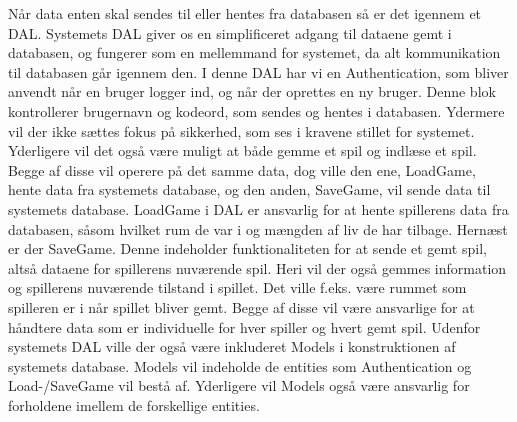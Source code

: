 Når data enten skal sendes til eller hentes fra databasen så er det igennem et DAL. Systemets DAL giver os en simplificeret adgang til dataene gemt i databasen, og fungerer som en mellemmand for systemet, da alt kommunikation til databasen går igennem den.
I denne DAL har vi en Authentication, som bliver anvendt når en bruger logger ind, og når der oprettes en ny bruger. Denne blok kontrollerer brugernavn og kodeord, som sendes og hentes i databasen. Ydermere vil der ikke sættes fokus på sikkerhed, som ses i kravene stillet for systemet.
Yderligere vil det også være muligt at både gemme et spil og indlæse et spil. Begge af disse vil operere på det samme data, dog ville den ene, LoadGame, hente data fra systemets database, og den anden, SaveGame, vil sende data til systemets database. 
LoadGame i DAL er ansvarlig for at hente spillerens data fra databasen, såsom hvilket rum de var i og mængden af liv de har tilbage. 
Hernæst er der SaveGame. Denne indeholder funktionaliteten for at sende et gemt spil, altså dataene for spillerens nuværende spil. Heri vil der også gemmes information og spillerens nuværende tilstand i spillet. Det ville f.eks. være rummet som spilleren er i når spillet bliver gemt.
Begge af disse vil være ansvarlige for at håndtere data som er individuelle for hver spiller og hvert gemt spil.
Udenfor systemets DAL ville der også være inkluderet Models i konstruktionen af systemets database. Models vil indeholde de entities som Authentication og Load-/SaveGame vil bestå af. Yderligere vil Models også være ansvarlig for forholdene imellem de forskellige entities. 

